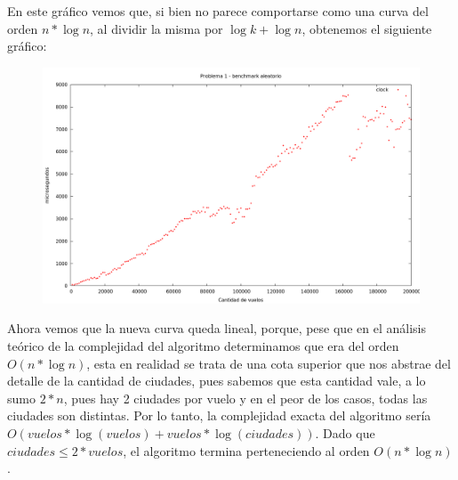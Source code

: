 \vspace*{0.5cm}

En este gráfico vemos que, si bien no parece comportarse como una curva del orden $n*\log n$, al dividir la misma por $\log k + \log n$, obtenemos el siguiente gráfico:

\vspace*{0.5cm}

\begin{figure}[h]
  \begin{center}
    \includegraphics[scale=0.35]{imagenes/grafico-1-v-ajustado.png}
  \end{center}
\end{figure}

\vspace*{0.5cm}


\newpage
Ahora vemos que la nueva curva queda lineal, porque, pese que en el análisis teórico de la complejidad del algoritmo determinamos que era del orden $O(n*\log n)$, esta en realidad se trata de una cota superior que nos abstrae del detalle de la cantidad de ciudades, pues sabemos que esta cantidad vale, a lo sumo $2*n$, pues hay 2 ciudades por vuelo y en el peor de los casos, todas las ciudades son distintas. Por lo tanto, la complejidad exacta del algoritmo sería $O(vuelos*\log(vuelos) + vuelos*\log(ciudades))$. Dado que               $ciudades \leq 2*vuelos$, el algoritmo termina perteneciendo al orden $O(n*\log n)$.
